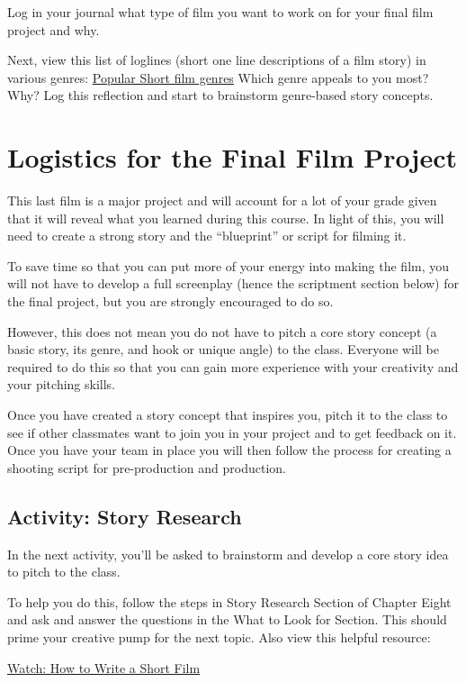 \documentclass[
]{book}
\begin{document}
\begin{reflect}
Log in your journal what type of film you want to work on for your final film project and why.

Next, view this list of loglines (short one line descriptions of a film story) in various genres: \href{https://www.slideshare.net/BigBadBoobyLady/popular-short-film-genres}{Popular Short film genres} Which genre appeals to you most? Why? Log this reflection and start to brainstorm genre-based story concepts.
\end{reflect}

\hypertarget{logistics-for-the-final-film-project}{%
\section{Logistics for the Final Film Project}\label{logistics-for-the-final-film-project}}

This last film is a major project and will account for a lot of your grade given that it will reveal what you learned during this course. In light of this, you will need to create a strong story and the ``blueprint'' or script for filming it.

To save time so that you can put more of your energy into making the film, you will not have to develop a full screenplay (hence the scriptment section below) for the final project, but you are strongly encouraged to do so.

However, this does not mean you do not have to pitch a core story concept (a basic story, its genre, and hook or unique angle) to the class. Everyone will be required to do this so that you can gain more experience with your creativity and your pitching skills.

Once you have created a story concept that inspires you, pitch it to the class to see if other classmates want to join you in your project and to get feedback on it. Once you have your team in place you will then follow the process for creating a shooting script for pre-production and production.

\hypertarget{activity-story-research}{%
\subsection*{Activity: Story Research}\label{activity-story-research}}

\begin{reflect}
In the next activity, you'll be asked to brainstorm and develop a core story idea to pitch to the class.

To help you do this, follow the steps in Story Research Section of Chapter Eight and ask and answer the questions in the What to Look for Section. This should prime your creative pump for the next topic. Also view this helpful resource:

\href{https://www.youtube.com/watch?v=wMqIQcTMlA0}{Watch: How to Write a Short Film}
\end{reflect}
\end{document}
